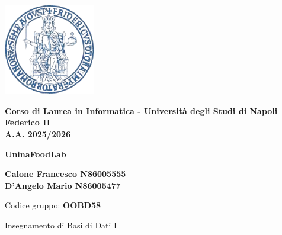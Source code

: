 \documentclass{article}
\begin{document}
\thispagestyle{firstpage}


\begin{center}
    \includegraphics[width=0.3\textwidth]{latex/immagini/uni_logo.png} 
    \vspace{0.5cm}

    {\large \textbf{Corso di Laurea in Informatica - Università degli Studi di Napoli Federico II}}\\
    {\large \textbf{A.A. 2025/2026}}\\[1cm]
    \vspace{1cm}

    {\Huge \color{myblue} \textbf{UninaFoodLab}}\\[2cm]

    \begin{flushleft}
    \centering
    {\large
    \textbf{Calone Francesco N86005555}\\
    \vspace{0.2cm}
    \textbf{D'Angelo Mario N86005477}\\
    }
    
    \vspace{0.2cm}
    {\small Codice gruppo: \textbf{OOBD58}}\\
    \vspace{0.8cm} 

    {\small Insegnamento di Basi di Dati I}
    \end{flushleft}
\end{center}


\newpage

\pagestyle{normal}

\tableofcontents
\thispagestyle{normal}




\end{document}
